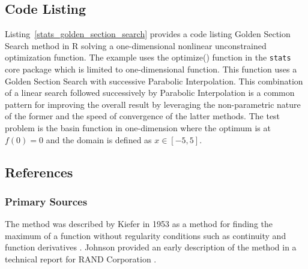 \subsection{Code Listing}
Listing~\ref{stats_golden_section_search} provides a code listing Golden Section Search method in R solving a one-dimensional nonlinear unconstrained optimization function.
The example uses the {optimize()} function in the \texttt{stats} core package which is limited to one-dimensional function. This function uses a Golden Section Search with successive Parabolic Interpolation. This combination of a linear search followed successively by Parabolic Interpolation is a common pattern for improving the overall result by leveraging the non-parametric nature of the former and the speed of convergence of the latter methods.
The test problem is the basin function in one-dimension where the optimum is at $f(0)=0$ and the domain is defined as $x \in [-5,5]$. 



\subsection{References}

\subsubsection{Primary Sources}
The method was described by Kiefer in 1953 as a method for finding the maximum of a function without regularity conditions such as continuity and function derivatives \cite{Kiefer1953}.
Johnson provided an early description of the method in a technical report for RAND Corporation \cite{Johnson1955}.

